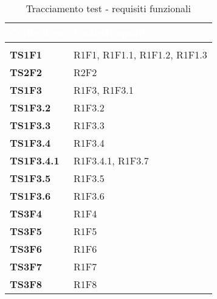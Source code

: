 \renewcommand{\arraystretch}{1.5}
\renewcommand{\arraystretch}{1.5}
\renewcommand\extrarowheight{1.5pt}
\begin{longtable}{C{2.5cm} C{10cm} } 
		\textcolor{white}{\textbf{CodiceTest}} & 
		\textcolor{white}{\textbf{CodiciRequsiti}} \\
		\endfirsthead
		 \\
	    \endfoot
	    \caption{Tracciamento test - requisiti funzionali}
	    \endlastfoot
		\hline
		\textbf{TS1F1} & R1F1, R1F1.1, R1F1.2, R1F1.3 \\
		\textbf{TS2F2} & R2F2 \\
		\textbf{TS1F3} & R1F3, R1F3.1 \\
		\textbf{TS1F3.2} & R1F3.2 \\
		\textbf{TS1F3.3} & R1F3.3 \\
		\textbf{TS1F3.4} & R1F3.4 \\
		\textbf{TS1F3.4.1} & R1F3.4.1, R1F3.7 \\
		\textbf{TS1F3.5} & R1F3.5 \\
		\textbf{TS1F3.6} & R1F3.6 \\
		\textbf{TS3F4} & R1F4 \\
		\textbf{TS3F5} & R1F5 \\
		\textbf{TS3F6} & R1F6 \\
		\textbf{TS3F7} & R1F7 \\
		\textbf{TS3F8} & R1F8 \\
\end{longtable}